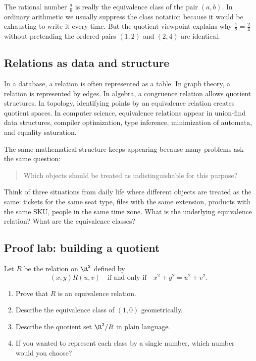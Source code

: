 The rational number $\frac{a}{b}$ is really the equivalence class of the pair $(a,b)$. In ordinary arithmetic we usually suppress the class notation because it would be exhausting to write it every time. But the quotient viewpoint explains why $\frac12=\frac24$ without pretending the ordered pairs $(1,2)$ and $(2,4)$ are identical.

\subsection{Relations as data and structure}

In a database, a relation is often represented as a table. In graph theory, a relation is represented by edges. In algebra, a congruence relation allows quotient structures. In topology, identifying points by an equivalence relation creates quotient spaces. In computer science, equivalence relations appear in union-find data structures, compiler optimization, type inference, minimization of automata, and equality saturation.

The same mathematical structure keeps appearing because many problems ask the same question:

\begin{quote}
Which objects should be treated as indistinguishable for this purpose?
\end{quote}

\begin{walkbox}
Think of three situations from daily life where different objects are treated as the same: tickets for the same seat type, files with the same extension, products with the same SKU, people in the same time zone. What is the underlying equivalence relation? What are the equivalence classes?
\end{walkbox}

\subsection{Proof lab: building a quotient}

\begin{labbox}
Let $R$ be the relation on $\R^2$ defined by
\[
(x,y)R(u,v)\quad\text{if and only if}\quad x^2+y^2=u^2+v^2.
\]
\begin{enumerate}
\item Prove that $R$ is an equivalence relation.
\item Describe the equivalence class of $(1,0)$ geometrically.
\item Describe the quotient set $\R^2/R$ in plain language.
\item If you wanted to represent each class by a single number, which number would you choose?
\end{enumerate}
\end{labbox}


